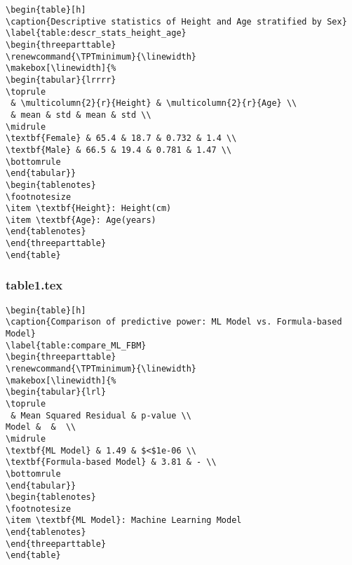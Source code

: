 \documentclass[11pt]{article}
\begin{document}
\begin{Verbatim}[tabsize=4]
\begin{table}[h]
\caption{Descriptive statistics of Height and Age stratified by Sex}
\label{table:descr_stats_height_age}
\begin{threeparttable}
\renewcommand{\TPTminimum}{\linewidth}
\makebox[\linewidth]{%
\begin{tabular}{lrrrr}
\toprule
 & \multicolumn{2}{r}{Height} & \multicolumn{2}{r}{Age} \\
 & mean & std & mean & std \\
\midrule
\textbf{Female} & 65.4 & 18.7 & 0.732 & 1.4 \\
\textbf{Male} & 66.5 & 19.4 & 0.781 & 1.47 \\
\bottomrule
\end{tabular}}
\begin{tablenotes}
\footnotesize
\item \textbf{Height}: Height(cm)
\item \textbf{Age}: Age(years)
\end{tablenotes}
\end{threeparttable}
\end{table}

\end{Verbatim}

\subsubsection*{table1.tex}

\begin{Verbatim}[tabsize=4]
\begin{table}[h]
\caption{Comparison of predictive power: ML Model vs. Formula-based Model}
\label{table:compare_ML_FBM}
\begin{threeparttable}
\renewcommand{\TPTminimum}{\linewidth}
\makebox[\linewidth]{%
\begin{tabular}{lrl}
\toprule
 & Mean Squared Residual & p-value \\
Model &  &  \\
\midrule
\textbf{ML Model} & 1.49 & $<$1e-06 \\
\textbf{Formula-based Model} & 3.81 & - \\
\bottomrule
\end{tabular}}
\begin{tablenotes}
\footnotesize
\item \textbf{ML Model}: Machine Learning Model
\end{tablenotes}
\end{threeparttable}
\end{table}

\end{Verbatim}
\end{document}
